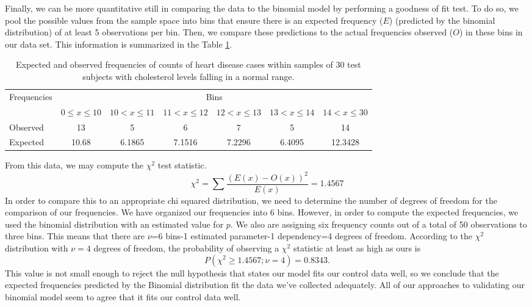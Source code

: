 \documentclass{amsart}
\begin{document}
Finally, we can be more quantitative still in comparing the data to the binomial model by performing a goodness of fit test.  To do so, we pool the possible values from the sample space into bins that ensure there is an expected frequency ($E$) (predicted by the binomial distribution) of at least 5 observations per bin.  Then, we compare these predictions to the actual frequencies observed ($O$) in these bins in our data set.  This information is summarized in the Table \ref{Tbl:chi2}.

\begin{table}
{\footnotesize
\begin{tabular}{lcccccc}
\toprule
\multirow{2}{*}{Frequencies} & \multicolumn{6}{c}{Bins}\\	
	& $0\le x\le 10$ &	$10<x\le 11$ & 	$11<x\le 12$ & $12<x\le 13$ & $13<x\le 14$ &$14<x\le 30$\\
	\midrule
Observed& 13& 5& 6 & 7 & 5 & 14\\
Expected & 10.68 & 6.1865 & 7.1516 & 7.2296 & 6.4095 & 12.3428\\
\bottomrule
\end{tabular}}
\caption{Expected and observed frequencies of counts of heart disease cases within samples of 30 test subjects with cholesterol levels falling in a normal range.\label{Tbl:chi2}}
\end{table}

From this data, we may compute the $\chi^2$ test statistic.
$$\chi^2=\sum\frac{(E(x)-O(x))^2}{E(x)}=1.4567$$
In order to compare this to an appropriate chi squared distribution, we need to determine the number of degrees of freedom for the comparison of our frequencies.  We have organized our frequencies into 6 bins.  However, in order to compute the expected frequencies, we used the binomial distribution with an estimated value for $p$.  We also are assigning six frequency counts out of a total of 50 observations to three bins. This means that there are $\nu$=6 bins-1 estimated parameter-1 dependency=4 degrees of freedom. According to the $\chi^2$ distribution with $\nu=4$ degrees of freedom, the probability of observing a $\chi^2$ statistic at least as high as ours is
$$P(\chi^2\ge 1.4567;\nu=4)=0.8343.$$
This value is not small enough to reject the null hypothesis that states our model fits our control data well, so we conclude that the expected frequencies predicted by the Binomial distribution fit the data we've collected adequately. All of our approaches to validating our binomial model seem to agree that it fits our control data well.
\end{document}
